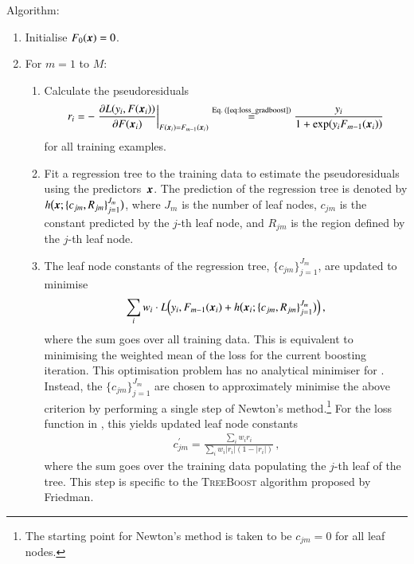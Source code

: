 \vspace{6pt}
\noindent Algorithm:
\begin{enumerate}[itemsep=1pt,topsep=4pt]

\item Initialise $F_0(\myvec{x}) = 0$.

\item For $m = 1$ to $M$:
  \begin{enumerate}[itemsep=1pt]

  \item Calculate the pseudoresiduals
    \begin{align*}
      r_i
      = - \left. \frac{\partial L(y_i, F(\myvec{x}_i))}
      {\partial F(\myvec{x}_i)}\right|_{F(\myvec{x}_i) = F_{m - 1}(\myvec{x}_i)}
      \overset{\text{Eq.\ (\ref{eq:loss_gradboost})}}{=}
      \frac{y_i}{1 + \exp(y_i F_{m-1}(\myvec{x}_i))}
    \end{align*}
    for all training examples.

  \item Fit a regression tree to the training data to estimate the
    pseudoresiduals using the predictors~$\myvec{x}$. The prediction of the
    regression tree is denoted by
    $h\bigl( \myvec{x}; \{c_{jm}, R_{jm}\}_{j=1}^{J_{m}} \bigr)$, where $J_{m}$
    is the number of leaf nodes, $c_{jm}$ is the constant predicted by the
    $j$-th leaf node, and $R_{jm}$ is the region defined by the $j$-th leaf
    node.

  \item The leaf node constants of the regression tree,
    $\{c_{jm}\}_{j=1}^{J_{m}}$, are updated to minimise
    \begin{align*}
      \sum_i w_i \cdot
      L\mathopen{}\left( y_i, F_{m - 1}(\myvec{x}_i)
      + h\bigl( \myvec{x}_i; \{c_{jm}, R_{jm}\}_{j=1}^{J_{m}} \bigr)
      \right)\mathclose{}
      \,\text{,}
    \end{align*}
    where the sum goes over all training data. This is equivalent to minimising
    the weighted mean of the loss for the current boosting iteration. This
    optimisation problem has no analytical minimiser for
    . Instead, the $\{c_{jm}\}_{j=1}^{J_{m}}$ are chosen
    to approximately minimise the above criterion by performing a single step of
    Newton's method.\footnote{The starting point for Newton's method is taken to
      be $c_{jm} = 0$ for all leaf nodes.} For the loss function in
    , this yields updated leaf node constants
    \begin{align*}
      c_{jm}^\prime = \frac{ \sum_i w_i r_i }{ \sum_i w_i |r_i| (1 - |r_i|)} \,\text{,}
    \end{align*}
    where the sum goes over the training data populating the $j$-th leaf of the
    tree. This step is specific to the \textsc{TreeBoost} algorithm proposed by
    Friedman.


\end{enumerate}
\end{enumerate}

